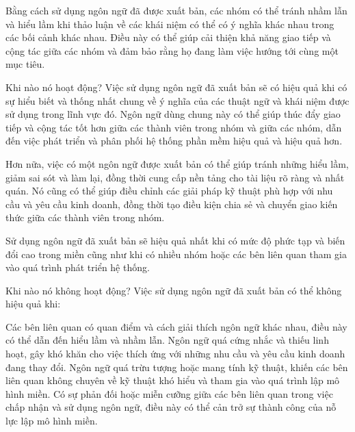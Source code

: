 Bằng cách sử dụng ngôn ngữ đã được xuất bản, các nhóm có thể tránh nhầm lẫn và hiểu lầm khi thảo luận về các khái niệm có thể có ý nghĩa khác nhau trong các bối cảnh khác nhau. Điều này có thể giúp cải thiện khả năng giao tiếp và cộng tác giữa các nhóm và đảm bảo rằng họ đang làm việc hướng tới cùng một mục tiêu.

Khi nào nó hoạt động?
Việc sử dụng ngôn ngữ đã xuất bản sẽ có hiệu quả khi có sự hiểu biết và thống nhất chung về ý nghĩa của các thuật ngữ và khái niệm được sử dụng trong lĩnh vực đó. Ngôn ngữ dùng chung này có thể giúp thúc đẩy giao tiếp và cộng tác tốt hơn giữa các thành viên trong nhóm và giữa các nhóm, dẫn đến việc phát triển và phân phối hệ thống phần mềm hiệu quả và hiệu quả hơn.

Hơn nữa, việc có một ngôn ngữ được xuất bản có thể giúp tránh những hiểu lầm, giảm sai sót và làm lại, đồng thời cung cấp nền tảng cho tài liệu rõ ràng và nhất quán. Nó cũng có thể giúp điều chỉnh các giải pháp kỹ thuật phù hợp với nhu cầu và yêu cầu kinh doanh, đồng thời tạo điều kiện chia sẻ và chuyển giao kiến thức giữa các thành viên trong nhóm.

Sử dụng ngôn ngữ đã xuất bản sẽ hiệu quả nhất khi có mức độ phức tạp và biến đổi cao trong miền cũng như khi có nhiều nhóm hoặc các bên liên quan tham gia vào quá trình phát triển hệ thống.

Khi nào nó không hoạt động?
Việc sử dụng ngôn ngữ đã xuất bản có thể không hiệu quả khi:

Các bên liên quan có quan điểm và cách giải thích ngôn ngữ khác nhau, điều này có thể dẫn đến hiểu lầm và nhầm lẫn.
Ngôn ngữ quá cứng nhắc và thiếu linh hoạt, gây khó khăn cho việc thích ứng với những nhu cầu và yêu cầu kinh doanh đang thay đổi.
Ngôn ngữ quá trừu tượng hoặc mang tính kỹ thuật, khiến các bên liên quan không chuyên về kỹ thuật khó hiểu và tham gia vào quá trình lập mô hình miền.
Có sự phản đối hoặc miễn cưỡng giữa các bên liên quan trong việc chấp nhận và sử dụng ngôn ngữ, điều này có thể cản trở sự thành công của nỗ lực lập mô hình miền.

